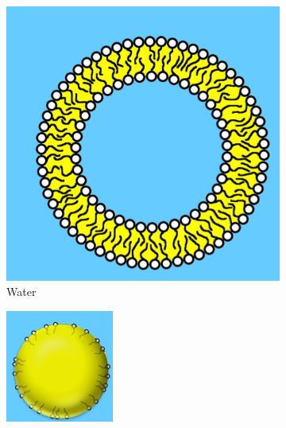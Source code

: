 \documentclass[]{article}
\begin{document}
\begin{figure}[H]
	\centering
	\caption[Self-assembled structures]{Self-assembled structures\cite{sojo2016origin}}
	\label{fig:self-assembled-structures}
	\begin{subfigure}[b]{0.3\textwidth}
		\centering
		\includegraphics[width=\textwidth]{SelfAssembled1}
		\caption{Water}
		\label{fig:water}
	\end{subfigure}
	\hfill
	\begin{subfigure}[b]{0.3\textwidth}
		\centering
		\includegraphics[width=\textwidth]{SelfAssembled2}

\end{subfigure}
\end{figure}
\end{document}
